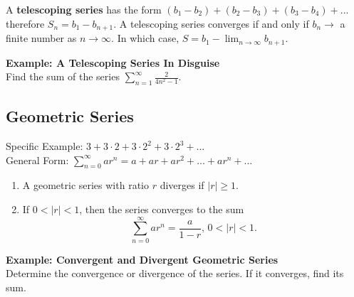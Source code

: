 \documentclass[addpoints, 12pt]{exam}
\begin{document}
\noindent A \textbf{telescoping series} has the form $(b_1-b_2)+(b_2-b_3)+(b_3-b_4)+...$ therefore $S_n=b_1-b_{n+1}$. A telescoping series converges if and only if $b_n\rightarrow$ a finite number as $n\rightarrow\infty$. In which case, $\displaystyle S=b_1-\lim_{n\to\infty}b_{n+1}$.

\newpage


\noindent\textbf{Example: A Telescoping Series In Disguise}\\
Find the sum of the series $\displaystyle\sum_{n=1}^{\infty}\frac{2}{4n^2-1}$.


\subsection*{Geometric Series}
Specific Example: $3+3\cdot2+3\cdot2^2+3\cdot2^3+...$\\
General Form: $\displaystyle\sum_{n=0}^{\infty}ar^n=a+ar+ar^2+...+ar^n+...$

\begin{tcolorbox}[title= CONVERGENCE OF A GEOMETRIC SERIES,black,sharp corners,colback=white,colbacktitle=white,coltitle=black]

    \begin{enumerate}
        \item A geometric series with ratio $r$ diverges if $|r|\ge1$.
        \item If $0<|r|<1$, then the series converges to the sum
        \[\displaystyle\sum_{n=0}^{\infty}ar^n=\frac{a}{1-r},\, 0<|r|<1.\]
    \end{enumerate}

\end{tcolorbox}
\vspace{.1in}

\noindent\textbf{Example: Convergent and Divergent Geometric Series}\\
Determine the convergence or divergence of the series. If it converges, find its sum.
\end{document}
